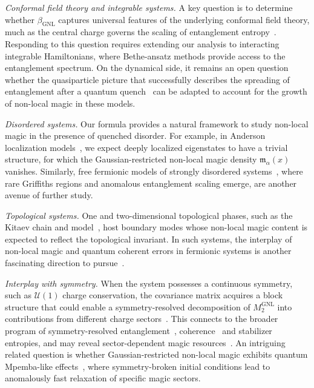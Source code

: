 \documentclass[aps,prl,twocolumn,superscriptaddress,reprint,longbibliography,nofootinbib]{revtex4-2}
\newcommand{\RENYI}{\alpha}
\begin{document}
\emph{Conformal field theory and integrable systems.}
A key question is to determine whether $\beta_{\mathrm{GNL}}$ captures universal features of the underlying conformal field theory, much as the central charge governs the scaling of entanglement entropy~\cite{Calabrese2004entanglement}.
Responding to this question requires extending our analysis to interacting integrable Hamiltonians, where Bethe-ansatz methods provide access to the entanglement spectrum.
On the dynamical side, it remains an open question whether the quasiparticle picture that successfully describes the spreading of entanglement after a quantum quench~\cite{Alba_2017,alba2019,Kudler_Flam_2021} can be adapted to account for the growth of non-local magic in these models.

\emph{Disordered systems.}
Our formula provides a natural framework to study non-local magic in the presence of quenched disorder. 
For example, in Anderson localization models~\cite{evers,sierant2020}, we expect deeply localized eigenstates to have a trivial structure, for which the Gaussian-restricted non-local magic density $\mathfrak{m}_\RENYI(x)$ vanishes. 
Similarly, free fermionic models of strongly disordered systems~\cite{IGLOI_2005,Monthus_2018,ruggiero2022}, where rare Griffiths regions and anomalous entanglement scaling emerge, are another avenue of further study.

\emph{Topological systems.}
One and two-dimensional topological phases, such as the Kitaev chain and model~\cite{Kitaev2001chain,Kitaev_2006}, host boundary modes whose non-local magic content is expected to reflect the topological invariant.
In such systems, the interplay of non-local magic and quantum coherent errors in fermionic systems is another fascinating direction to pursue~\cite{beri,gskb-t5ql}.

\emph{Interplay with symmetry.}
When the system possesses a continuous symmetry, such as $\mathcal{U}(1)$ charge conservation, the covariance matrix acquires a block structure that could enable a symmetry-resolved decomposition of $M_2^{\mathrm{GNL}}$ into contributions from different charge sectors~\cite{Goldstein}.
This connects to the broader program of symmetry-resolved entanglement~\cite{Bianchi_2022}, coherence~\cite{aditya2026coherencedynamicsquantummanybody} and stabilizer entropies, and may reveal sector-dependent magic resources~\cite{iannotti2026nonstabilizernessu1symmetrychaotic, cepollaro2025stabilizerentropysubspaces, Esposito_2024}.
An intriguing related question is whether Gaussian-restricted non-local magic exhibits quantum Mpemba-like effects~\cite{Ares_2023,Ares_2025,aditya2025mpembaeffectsquantumcomplexity}, where symmetry-broken initial conditions lead to anomalously fast relaxation of specific magic sectors.
\end{document}
